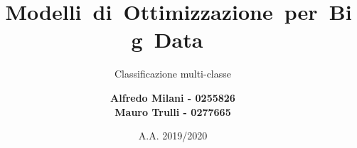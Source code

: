 \title {
	\vspace{4.5cm}
	\mbox{
		Modelli di Ottimizzazione per Big Data
	}
}

\subtitle {
	Classificazione multi-classe
	\vspace{3.5cm}
}

\author{
	\textbf{Alfredo Milani - 0255826} \\
    \textbf{Mauro Trulli - 0277665}
}

\date{
	A.A. 2019/2020
}



\begin{titlepage}
	\maketitle
	\vspace*{\fill}
    \thispagestyle{empty}
\end{titlepage}
\clearpage
\empypage



\doublespacing

\tableofcontents
\clearpage
\empypage



\listoffigures
\clearpage
\empypage



\listoftables
\clearpage
\empypage



\singlespacing
